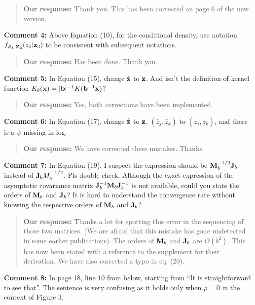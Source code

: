 \documentclass[
  12pt,
  letterpaper]{article}
\numberwithin{equation}{section}
\begin{document}
\begin{quote}
\textbf{Our response:} Thank you. This has been corrected on page 6 of the new version.
\end{quote}

\textbf{Comment 4:} Above Equation (10), for the conditional density, use notation \(f_{Z_1|{\bf Z}_3}(z_1|{\bf z}_3)\) to be consistent with subsequent notations.

\begin{quote}
\textbf{Our response:} Has been done. Thank you.
\end{quote}

\textbf{Comment 5:} In Equation (15), change \(\hat{\bf z}\) to \({\bf z}\). And isn't the definition of kernel function \(K_b({\bf x}) = |{\bf b}|^{-1}K({\bf b}^{-1}{\bf x})\)?

\begin{quote}
\textbf{Our response:} Yes, both corrections have been implemented.
\end{quote}

\textbf{Comment 6:} In Equation (17), change \(\hat{\bf z}\) to \({\bf z}\), \((\hat{z}_j,\hat{z}_k)\) to \((z_j,z_k)\), and there is a \(\psi\) missing in log.

\begin{quote}
\textbf{Our response:} We have corrected these mistakes. Thanks.
\end{quote}

\textbf{Comment 7:} In Equation (19), I suspect the expression should be \({\bf M}_b^{-1/2}{\bf J}_b\) instead of \({\bf J}_{b}M_{b}^{-1/2}\). Pls double check. Although the exact expression of the asymptotic covariance matrix \({\bf J}_b^{-1}{\bf M}_b{\bf J}_b^{-1}\) is not available, could you state the orders of \({\bf M}_b\) and \({\bf J}_b\)? It is hard to understand the convergence rate without knowing the respective orders of \({\bf M}_b\) and \({\bf J}_b\)?

\begin{quote}
\textbf{Our response:} Thanks a lot for spotting this error in the sequencing of those two matrices. (We are afraid that this mistake has gone undetected in some earlier publications). The orders of \({\bf M}_b\) and \({\bf J}_b\) are \(O(b^2)\). This has now been stated with a reference to the supplement for their derivation. We have also corrected a typo in eq. (20).
\end{quote}

\textbf{Comment 8:} In page 18, line 10 from below, starting from ``It is straightforward to see that''. The sentence is very confusing as it holds only when \(\rho = 0\) in the context of Figure 3.
\end{document}
